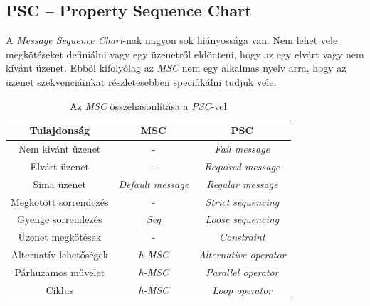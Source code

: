 \subsection{PSC – Property Sequence Chart}
A \textit{Message Sequence Chart}-nak nagyon sok hiányossága van.
Nem lehet vele megkötéseket definiálni vagy egy üzenetről eldönteni, hogy az egy elvárt vagy nem kívánt üzenet.
Ebből kifolyólag az \textit{MSC} nem egy alkalmas nyelv arra, hogy az üzenet szekvenciáinkat részletesebben specifikálni tudjuk vele.

\begin{table}[ht]
    \centering %
    \begin{tabular}{ |c|c|c| } %
    \hline
    \textbf{Tulajdonság} & \textbf{MSC} & \textbf{PSC} \\ [0.5ex] %
    \hline %
    \hline
    Nem kivánt üzenet & - & \textit{Fail message} \\ %
    \hline
    Elvárt üzenet & - & \textit{Required message} \\
    \hline
    Sima üzenet & \textit{Default message} & \textit{Regular message} \\
    \hline
    Megkötött sorrendezés & - & \textit{Strict sequencing} \\
    \hline
    Gyenge sorrendezés & \textit{Seq} & \textit{Loose sequencing} \\
    \hline
    Üzenet megkötések & - & \textit{Constraint} \\
    \hline
    Alternatív lehetőségek & \textit{h-MSC} & \textit{Alternative operator} \\
    \hline
    Párhuzamos művelet & \textit{h-MSC} & \textit{Parallel operator} \\
    \hline
    Ciklus & \textit{h-MSC} & \textit{Loop operator} \\
    \hline %
    \end{tabular}
    \caption{Az \textit{MSC} összehasonlítása a \textit{PSC}-vel} %
    \label{psc_tablazat} %
\end{table}

